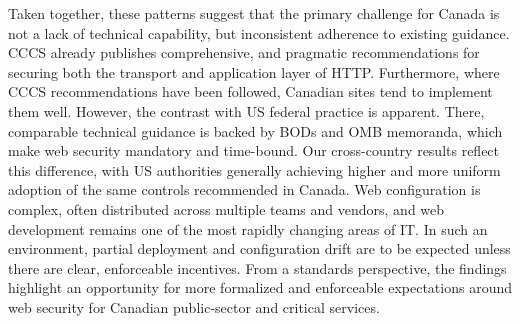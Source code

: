 \documentclass[pdflatex,sn-mathphys-num]{sn-jnl}
\numberwithin{equation}{section}
\theoremstyle{thmstyleone}
\theoremstyle{thmstyletwo}%
\theoremstyle{thmstylethree}%
\begin{document}


\vspace{1em}Taken together, these patterns suggest that the primary challenge for Canada is not a lack of 
technical capability, but inconsistent adherence to existing guidance. CCCS already publishes comprehensive, 
and pragmatic recommendations for securing both the transport and application layer of HTTP. Furthermore, 
where CCCS recommendations have been followed, Canadian sites tend to implement them well. However, the contrast 
with US federal practice is apparent. There, comparable technical guidance is backed by BODs and OMB 
memoranda, which make web security mandatory and time-bound. Our cross-country results 
reflect this difference, with US authorities generally achieving higher and more uniform 
adoption of the same controls recommended in Canada. Web configuration is complex, often distributed 
across multiple teams and vendors, and web development remains one of the most rapidly changing areas of IT.
In such an environment, partial deployment and configuration drift are to be expected unless there are clear, 
enforceable incentives. From a standards perspective, the findings highlight an opportunity 
for more formalized and enforceable expectations around web security for Canadian public-sector and critical 
services.
\end{document}
